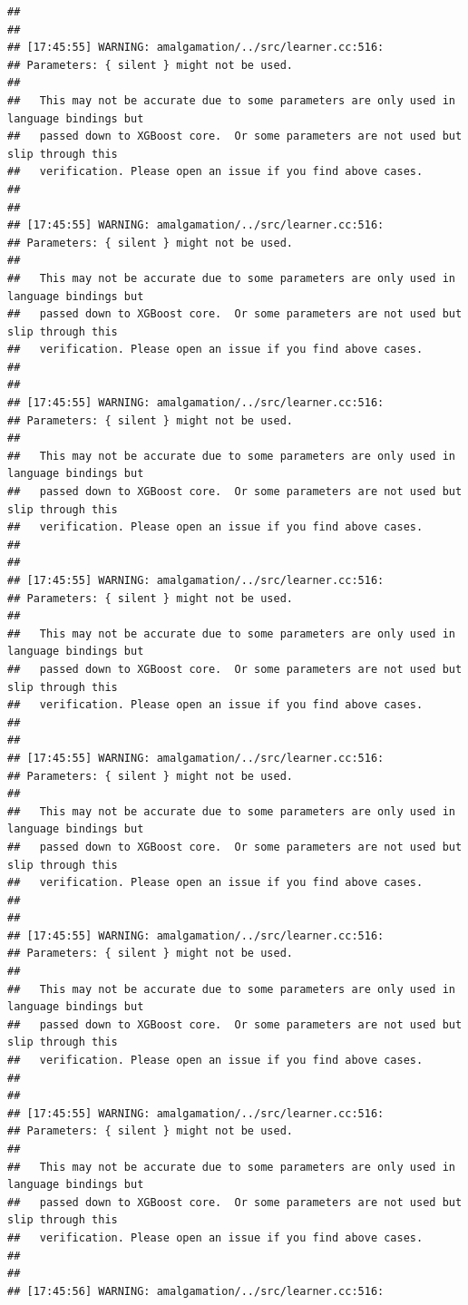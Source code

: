 \documentclass[AMS,STIX2COL]{WileyNJD-v2}\usepackage[]{graphicx}\usepackage[]{color}
\makeatletter
\newenvironment{kframe}{%
 \def\at@end@of@kframe{}%
 \ifinner\ifhmode%
  \def\at@end@of@kframe{\end{minipage}}%
  \begin{minipage}{\columnwidth}%
 \fi\fi%
 \def\FrameCommand##1{\hskip\@totalleftmargin \hskip-\fboxsep
 \colorbox{shadecolor}{##1}\hskip-\fboxsep
     \hskip-\linewidth \hskip-\@totalleftmargin \hskip\columnwidth}%
 \MakeFramed {\advance\hsize-\width
   \@totalleftmargin\z@ \linewidth\hsize
   \@setminipage}}%
 {\par\unskip\endMakeFramed%
 \at@end@of@kframe}
\newenvironment{knitrout}{}{} %
\makeatother
\begin{document}
\begin{knitrout}
\begin{kframe}
\begin{verbatim}
## 
## 
## [17:45:55] WARNING: amalgamation/../src/learner.cc:516: 
## Parameters: { silent } might not be used.
## 
##   This may not be accurate due to some parameters are only used in language bindings but
##   passed down to XGBoost core.  Or some parameters are not used but slip through this
##   verification. Please open an issue if you find above cases.
## 
## 
## [17:45:55] WARNING: amalgamation/../src/learner.cc:516: 
## Parameters: { silent } might not be used.
## 
##   This may not be accurate due to some parameters are only used in language bindings but
##   passed down to XGBoost core.  Or some parameters are not used but slip through this
##   verification. Please open an issue if you find above cases.
## 
## 
## [17:45:55] WARNING: amalgamation/../src/learner.cc:516: 
## Parameters: { silent } might not be used.
## 
##   This may not be accurate due to some parameters are only used in language bindings but
##   passed down to XGBoost core.  Or some parameters are not used but slip through this
##   verification. Please open an issue if you find above cases.
## 
## 
## [17:45:55] WARNING: amalgamation/../src/learner.cc:516: 
## Parameters: { silent } might not be used.
## 
##   This may not be accurate due to some parameters are only used in language bindings but
##   passed down to XGBoost core.  Or some parameters are not used but slip through this
##   verification. Please open an issue if you find above cases.
## 
## 
## [17:45:55] WARNING: amalgamation/../src/learner.cc:516: 
## Parameters: { silent } might not be used.
## 
##   This may not be accurate due to some parameters are only used in language bindings but
##   passed down to XGBoost core.  Or some parameters are not used but slip through this
##   verification. Please open an issue if you find above cases.
## 
## 
## [17:45:55] WARNING: amalgamation/../src/learner.cc:516: 
## Parameters: { silent } might not be used.
## 
##   This may not be accurate due to some parameters are only used in language bindings but
##   passed down to XGBoost core.  Or some parameters are not used but slip through this
##   verification. Please open an issue if you find above cases.
## 
## 
## [17:45:55] WARNING: amalgamation/../src/learner.cc:516: 
## Parameters: { silent } might not be used.
## 
##   This may not be accurate due to some parameters are only used in language bindings but
##   passed down to XGBoost core.  Or some parameters are not used but slip through this
##   verification. Please open an issue if you find above cases.
## 
## 
## [17:45:56] WARNING: amalgamation/../src/learner.cc:516: 

\end{verbatim}
\end{kframe}
\end{knitrout}
\end{document}
